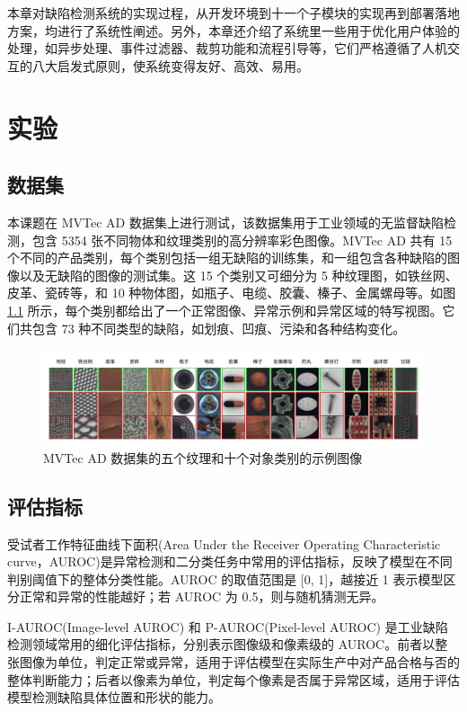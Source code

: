 \documentclass[
  ]{njuthesis}
\begin{document}
本章对缺陷检测系统的实现过程，从开发环境到十一个子模块的实现再到部署落地方案，均进行了系统性阐述。另外，本章还介绍了系统里一些用于优化用户体验的处理，如异步处理、事件过滤器、裁剪功能和流程引导等，它们严格遵循了人机交互的八大启发式原则，使系统变得友好、高效、易用。

\chapter{实验}

\section{数据集}

本课题在 MVTec AD\cite{[16]} 数据集上进行测试，该数据集用于工业领域的无监督缺陷检测，包含 5354 张不同物体和纹理类别的高分辨率彩色图像。MVTec AD 共有 15 个不同的产品类别，每个类别包括一组无缺陷的训练集，和一组包含各种缺陷的图像以及无缺陷的图像的测试集。这 15 个类别又可细分为 5 种纹理图，如铁丝网、皮革、瓷砖等，和 10 种物体图，如瓶子、电缆、胶囊、榛子、金属螺母等。如图 \ref{MVTec} 所示，每个类别都给出了一个正常图像、异常示例和异常区域的特写视图。它们共包含 73 种不同类型的缺陷，如划痕、凹痕、污染和各种结构变化。

\begin{figure}[htb]
    \centering
    \includegraphics[width=\textwidth]{images/MVTec.png}
    \caption{MVTec AD 数据集的五个纹理和十个对象类别的示例图像}
    \label{MVTec}
\end{figure}

\section{评估指标}

受试者工作特征曲线下面积(Area Under the Receiver Operating Characteristic curve，AUROC)是异常检测和二分类任务中常用的评估指标，反映了模型在不同判别阈值下的整体分类性能。AUROC 的取值范围是 [0, 1]，越接近 1 表示模型区分正常和异常的性能越好；若 AUROC 为 0.5，则与随机猜测无异。

I-AUROC(Image-level AUROC) 和 P-AUROC(Pixel-level AUROC) 是工业缺陷检测领域常用的细化评估指标，分别表示图像级和像素级的 AUROC。前者以整张图像为单位，判定正常或异常，适用于评估模型在实际生产中对产品合格与否的整体判断能力；后者以像素为单位，判定每个像素是否属于异常区域，适用于评估模型检测缺陷具体位置和形状的能力。
\end{document}
